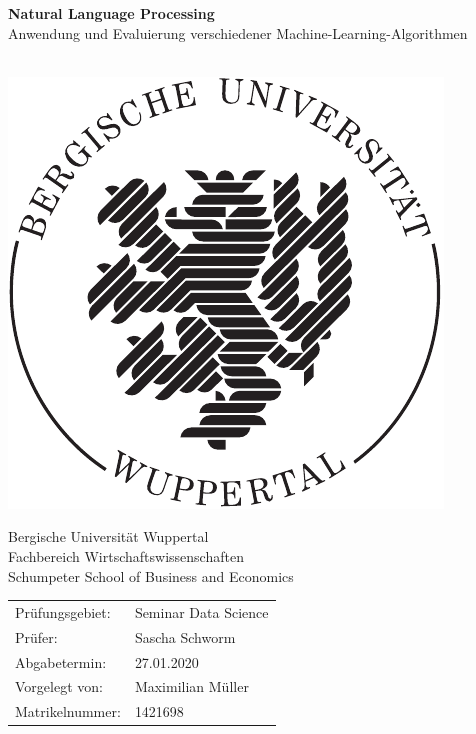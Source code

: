 \documentclass[a4paper,12pt]{article}
\begin{document}
\begin{titlepage} 
\begin{center}
\begin{Huge} 
\textbf{Natural Language Processing} \\
\smallskip
\Large Anwendung und Evaluierung verschiedener Machine-Learning-Algorithmen
\bigskip
\bigskip
\end{Huge}
\\



\includegraphics[scale=0.6]{loewe}\\
\bigskip
\bigskip

Bergische Universität Wuppertal\\[0.2cm]
Fachbereich Wirtschaftswissenschaften\\
Schumpeter School of Business and Economics\\
\end{center}
\vspace{11cm}
\begin{tabular}{ll}
Prüfungsgebiet: & Seminar Data Science \\
Prüfer: & Sascha Schworm\\
Abgabetermin: & 27.01.2020\\
Vorgelegt von: & Maximilian Müller\\
Matrikelnummer: & 1421698
\end{tabular}
\end{titlepage} 
\end{document}
